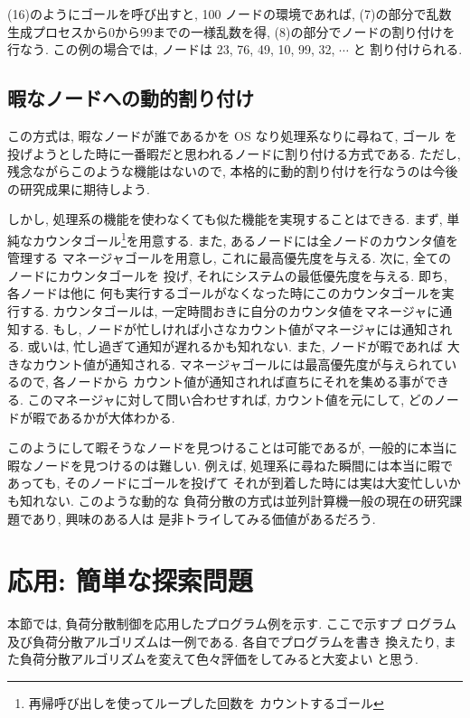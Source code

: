 \documentclass[a4,titlepage]{jsreport}
\begin{document}
(16)のようにゴールを呼び出すと, 100 ノードの環境であれば, 
(7)の部分で乱数生成プロセスから0から99までの一様乱数を得, 
(8)の部分でノードの割り付けを行なう.  
この例の場合では, ノードは 23, 76, 49, 10, 99, 32, $\cdots$ と
割り付けられる.  

\subsection*{暇なノードへの動的割り付け}

この方式は, 暇なノードが誰であるかを OS なり処理系なりに尋ねて, ゴール
を投げようとした時に一番暇だと思われるノードに割り付ける方式である. 
ただし, 残念ながらこのような機能はないので,
本格的に動的割り付けを行なうのは今後の研究成果に期待しよう.  

しかし, 処理系の機能を使わなくても似た機能を実現することはできる.  
まず, 単純なカウンタゴール\footnote{再帰呼び出しを使ってループした回数を
カウントするゴール}を用意する.  
また, あるノードには全ノードのカウンタ値を管理する
マネージャゴールを用意し, これに最高優先度を与える.  
次に, 全てのノードにカウンタゴールを
投げ, それにシステムの最低優先度を与える.  即ち, 各ノードは他に
何も実行するゴールがなくなった時にこのカウンタゴールを実行する.  
カウンタゴールは, 一定時間おきに自分のカウンタ値をマネージャに通知する.  
もし, ノードが忙しければ小さなカウント値がマネージャには通知される.  
或いは, 忙し過ぎて通知が遅れるかも知れない.  また, ノードが暇であれば
大きなカウント値が通知される.  
マネージャゴールには最高優先度が与えられているので, 各ノードから
カウント値が通知されれば直ちにそれを集める事ができる.  
このマネージャに対して問い合わせすれば, 
カウント値を元にして, どのノードが暇であるかが大体わかる.  

このようにして暇そうなノードを見つけることは可能であるが, 
一般的に本当に暇なノードを見つけるのは難しい.  
例えば, 処理系に尋ねた瞬間には本当に暇であっても, そのノードにゴールを投げて
それが到着した時には実は大変忙しいかも知れない.  このような動的な
負荷分散の方式は並列計算機一般の現在の研究課題であり, 興味のある人は
是非トライしてみる価値があるだろう.  


\section{応用: 簡単な探索問題}

本節では, 負荷分散制御を応用したプログラム例を示す.  ここで示すプ
ログラム及び負荷分散アルゴリズムは一例である.  各自でプログラムを書き
換えたり, また負荷分散アルゴリズムを変えて色々評価をしてみると大変よい
と思う.
\end{document}
